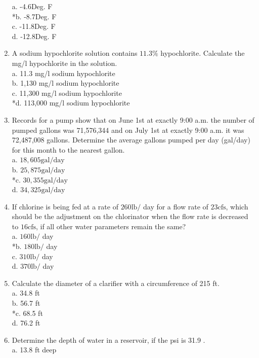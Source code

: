 \begin{enumerate}
a. -4.6Deg. F\\
*b. -8.7Deg. F\\
c. -11.8Deg. F\\
d. -12.8Deg. F\\
  \item A sodium hypochlorite solution contains $11.3 \%$ hypochlorite. Calculate the mg/l hypochlorite in the solution.\\
a. 11.3 mg/l sodium hypochlorite\\
b. 1,130 mg/l sodium hypochlorite\\
c. 11,300 mg/l sodium hypochlorite\\
*d. 113,000 mg/l sodium hypochlorite\\
  \item Records for a pump show that on June 1st at exactly 9:00 a.m. the number of pumped gallons was 71,576,344 and on July 1st at exactly 9:00 a.m. it was 72,487,008 gallons. Determine the average gallons pumped per day (gal/day) for this month to the nearest gallon.\\
a. $18,605 \mathrm{gal} / \mathrm{day}$\\
b. $25,875 \mathrm{gal} / \mathrm{day}$\\
*c. $30,355 \mathrm{gal} / \mathrm{day}$\\
d. $34,325 \mathrm{gal} / \mathrm{day}$ \\
\item If chlorine is being fed at a rate of $260 \mathrm{lb} /$ day for a flow rate of $23 \mathrm{cfs}$, which should be the adjustment on the chlorinator when the flow rate is decreased to $16 \mathrm{cfs}$, if all other water parameters remain the same?\\
a. $160 \mathrm{lb} /$ day\\
*b. $180 \mathrm{lb} /$ day\\
c. $310 \mathrm{lb} /$ day\\
d. $370 \mathrm{lb} /$ day\\
  \item Calculate the diameter of a clarifier with a circumference of 215 ft.\\
a. 34.8 ft\\
b. 56.7 ft\\
*c. 68.5 ft\\
d. 76.2 ft\\
  \item Determine the depth of water in a reservoir, if the psi is 31.9 .\\
a. 13.8 ft deep\\

\end{enumerate}
